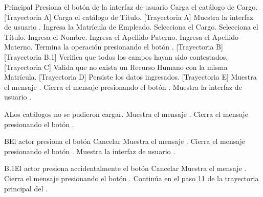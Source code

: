 \begin{UCtrayectoria}{Principal}
    \UCpaso[\UCactor] Presiona el botón  de la interfaz de usuario 
    \UCpaso Carga el catálogo de Cargo. [Trayectoria A]
    \UCpaso Carga el catálogo de Título. [Trayectoria A]
    \UCpaso Muestra la interfaz de usuario .
    \UCpaso[\UCactor] Ingresa la Matrícula de Empleado.
    \UCpaso[\UCactor] Selecciona el Cargo.
    \UCpaso[\UCactor] Selecciona el Título.
    \UCpaso[\UCactor] Ingresa el Nombre.
    \UCpaso[\UCactor] Ingresa el Apellido Paterno.
    \UCpaso[\UCactor] Ingresa el Apellido Materno.
    \UCpaso[\UCactor] Termina la operación presionando el botón . [Trayectoria B] [Trayectoria B.1]
    \UCpaso Verifica que todos los campos hayan sido contestados. [Trayectoria C]
    \UCpaso Valida que no exista un Recurso Humano con la misma Matrícula. [Trayectoria D]
    \UCpaso Persiste los datos ingresados. [Trayectoria E]
    \UCpaso Muestra el mensaje .
    \UCpaso[\UCactor] Cierra el mensaje presionando el botón .
    \UCpaso Muestra la interfaz de usuario .
\end{UCtrayectoria}
\begin{UCtrayectoriaA}{A}{Los catálogos no se pudieron cargar.}
    \UCpaso Muestra el mensaje .
    \UCpaso[\UCactor] Cierra el mensaje presionando el botón .
\end{UCtrayectoriaA}
\begin{UCtrayectoriaA}{B}{El actor presiona el botón Cancelar}
    \UCpaso Muestra el mensaje .
    \UCpaso[\UCactor] Cierra el mensaje presionando el botón .
    \UCpaso Muestra la interfaz de usuario .
\end{UCtrayectoriaA}
\begin{UCtrayectoriaA}{B.1}{El actor presiona accidentalmente el botón Cancelar}
    \UCpaso Muestra el mensaje .
    \UCpaso[\UCactor] Cierra el mensaje presionando el botón .
    \UCpaso Continúa en el paso 11 de la trayectoria principal del .
\end{UCtrayectoriaA}
